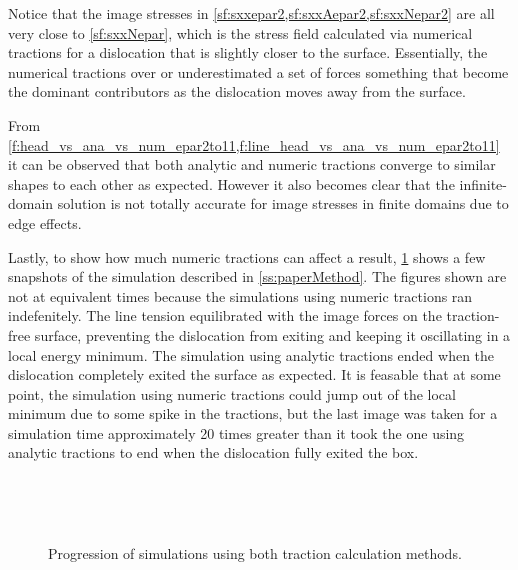 Notice that the image stresses in \cref{sf:sxxepar2,sf:sxxAepar2,sf:sxxNepar2} are all very close to \cref{sf:sxxNepar}, which is the stress field calculated via numerical tractions for a dislocation that is slightly closer to the surface. Essentially, the numerical tractions over or underestimated a set of forces something that become the dominant contributors as the dislocation moves away from the surface.

From \cref{f:head_vs_ana_vs_num_epar2to11,f:line_head_vs_ana_vs_num_epar2to11} it can be observed that both analytic and numeric tractions converge to similar shapes to each other as expected. However it also becomes clear that the infinite-domain solution is not totally accurate for image stresses in finite domains due to edge effects.

Lastly, to show how much numeric tractions can affect a result, \cref{f:simulation} shows a few snapshots of the simulation described in \cref{ss:paperMethod}. The figures shown are not at equivalent times because the simulations using numeric tractions ran indefenitely. The line tension equilibrated with the image forces on the traction-free surface, preventing the dislocation from exiting and keeping it oscillating in a local energy minimum. The simulation using analytic tractions ended when the dislocation completely exited the surface as expected. It is feasable that at some point, the simulation using numeric tractions could jump out of the local minimum due to some spike in the tractions, but the last image was taken for a simulation time approximately 20 times greater than it took the one using analytic tractions to end when the dislocation fully exited the box.
\begin{figure}
    ~
    ~

    ~
    ~
    \caption[Unloaded simulations using analytic and numeric tractions.]{Progression of simulations using both traction calculation methods.}
    \label{f:simulation}
\end{figure}


